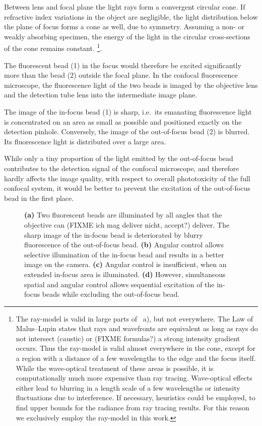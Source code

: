 Between lens and focal plane the light rays form a convergent circular
cone. If refractive index variations in the object are negligible, the
light distribution below the plane of focus forms a cone as well, due
to symmetry.  Assuming a non- or weakly absorbing specimen, the energy
of the light in the circular cross-sections of the cone remains
constant.  \footnote{The ray-model is valid in large
  parts of ~a), but not everywhere. The Law
  of Malus--Lupin states that rays and wavefronts are equivalent as
  long as rays do not intersect (caustic) or (FIXME formulas?) a
  strong intensity gradient occurs. Thus the ray-model is valid almost
  everywhere in the cone, except for a region with a distance of a few
  wavelengths to the edge and the focus itself. While the wave-optical
  treatment of these areas is possible, it is computationally much
  more expensive than ray tracing. Wave-optical effects either lead to
  blurring in a length scale of a few wavelengths or intensity
  fluctuations due to interference. If necessary, heuristics could be
  employed, to find upper bounds for the radiance from ray tracing
  results. For this reason we exclusively employ the ray-model in this
  work.}.


The fluorescent bead (1) in the focus would therefore be excited
significantly more than the bead (2) outside the focal plane. In the
confocal fluorescence microscope, the fluorescence light of the two
beads is imaged by the objective lens and the detection tube lens into
the intermediate image plane.

The image of the in-focus bead (1) is sharp, i.e.\ its emanating
fluorescence light is concentrated on an area as small as possible and
positioned exactly on the detection pinhole. Conversely, the image of
the out-of-focus bead (2) is blurred. Its fluorescence light is
distributed over a large area.

While only a tiny proportion of the light emitted by the out-of-focus
bead contributes to the detection signal of the confocal microscope,
and therefore hardly affects the image quality, with respect to
overall phototoxicity of the full confocal system, it would be better
to prevent the excitation of the out-of-focus bead in the first place.

\begin{figure}[!hbt]
  \centering
  \caption{{\bf (a)} Two fluorescent beads are illuminated by all
    angles that the objective can (FIXME ich mag deliver nicht,
    accept?) deliver. The sharp image of the in-focus bead is
    deteriorated by blurry fluorescence of the out-of-focus bead. {\bf
      (b)} Angular control allows selective illumination of the
    in-focus bead and results in a better image on the camera. {\bf
      (c)} Angular control is insufficient, when an extended in-focus
    area is illuminated. {\bf (d)} However, simultaneous spatial and
    angular control allows sequential excitation of the in-focus beads
    while excluding the out-of-focus bead.}
  \label{fig:hourglass-all}
\end{figure}

